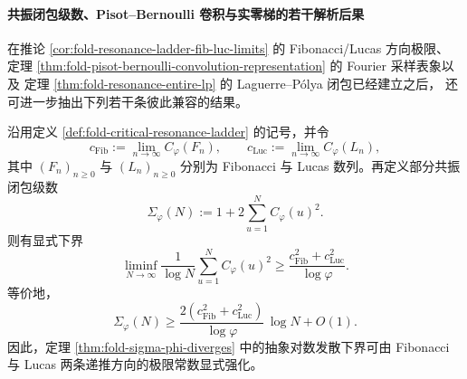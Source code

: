 \paragraph{共振闭包级数、Pisot--Bernoulli 卷积与实零梯的若干解析后果}
在推论 \ref{cor:fold-resonance-ladder-fib-luc-limits} 的 Fibonacci/Lucas 方向极限、
定理 \ref{thm:fold-pisot-bernoulli-convolution-representation} 的 Fourier 采样表象以及
定理 \ref{thm:fold-resonance-entire-lp} 的 Laguerre--P\'olya 闭包已经建立之后，
还可进一步抽出下列若干条彼此兼容的结果。

\begin{theorem}\label{thm:xi-resonance-closure-log-lower-bound-fib-luc}
沿用定义 \ref{def:fold-critical-resonance-ladder} 的记号，并令
\[
c_{\mathrm{Fib}}:=\lim_{n\to\infty}C_\varphi(F_n),
\qquad
c_{\mathrm{Luc}}:=\lim_{n\to\infty}C_\varphi(L_n),
\]
其中 \((F_n)_{n\ge 0}\) 与 \((L_n)_{n\ge 0}\) 分别为 Fibonacci 与 Lucas 数列。再定义部分共振闭包级数
\[
\Sigma_\varphi(N):=1+2\sum_{u=1}^{N}C_\varphi(u)^2.
\]
则有显式下界
\[
\boxed{\;
\liminf_{N\to\infty}
\frac{1}{\log N}\sum_{u=1}^{N}C_\varphi(u)^2
\ge
\frac{c_{\mathrm{Fib}}^2+c_{\mathrm{Luc}}^2}{\log\varphi}.\;}
\]
等价地，
\[
\boxed{\;
\Sigma_\varphi(N)\ge
\frac{2(c_{\mathrm{Fib}}^2+c_{\mathrm{Luc}}^2)}{\log\varphi}\,\log N+O(1).\;}
\]
因此，定理 \ref{thm:fold-sigma-phi-diverges} 中的抽象对数发散下界可由
Fibonacci 与 Lucas 两条递推方向的极限常数显式强化。
\end{theorem}




